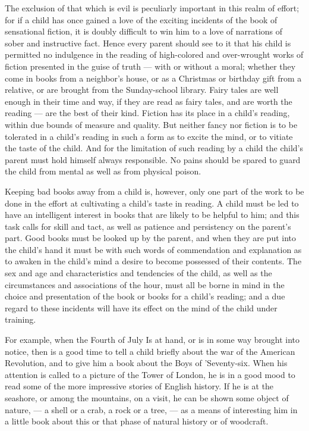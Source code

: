 \documentclass[
]{book}
\begin{document}
The exclusion of that which is evil is peculiarly important in this realm of effort; for if a child has once gained a love of the exciting incidents of the book of sensational fiction, it is doubly difficult to win him to a love of narrations of sober and instructive fact. Hence every parent should see to it that his child is permitted no indulgence in the reading of high-colored and over-wrought works of fiction presented in the guise of truth --- with or without a moral; whether they come in books from a neighbor's house, or as a Christmas or birthday gift from a relative, or are brought from the Sunday-school library. Fairy tales are well enough in their time and way, if they are read as fairy tales, and are worth the reading --- are the best of their kind. Fiction has its place in a child's reading, within due bounds of measure and quality. But neither fancy nor fiction is to be tolerated in a child's reading in such a form as to excite the mind, or to vitiate the taste of the child. And for the limitation of such reading by a child the child's parent must hold himself always responsible. No pains should be spared to guard the child from mental as well as from physical poison.

Keeping bad books away from a child is, however, only one part of the work to be done in the effort at cultivating a child's taste in reading. A child must be led to have an intelligent interest in books that are likely to be helpful to him; and this task calls for skill and tact, as well as patience and persistency on the parent's part. Good books must be looked up by the parent, and when they are put into the child's hand it must be with such words of commendation and explanation as to awaken in the child's mind a desire to become possessed of their contents. The sex and age and characteristics and tendencies of the child, as well as the circumstances and associations of the hour, must all be borne in mind in the choice and presentation of the book or books for a child's reading; and a due regard to these incidents will have its effect on the mind of the child under training.

For example, when the Fourth of July Is at hand, or is in some way brought into notice, then is a good time to tell a child briefly about the war of the American Revolution, and to give him a book about the Boys of 'Seventy-six. When his attention is called to a picture of the Tower of London, he is in a good mood to read some of the more impressive stories of English history. If he is at the seashore, or among the mountains, on a visit, he can be shown some object of nature, --- a shell or a crab, a rock or a tree, --- as a means of interesting him in a little book about this or that phase of natural history or of woodcraft.
\end{document}
